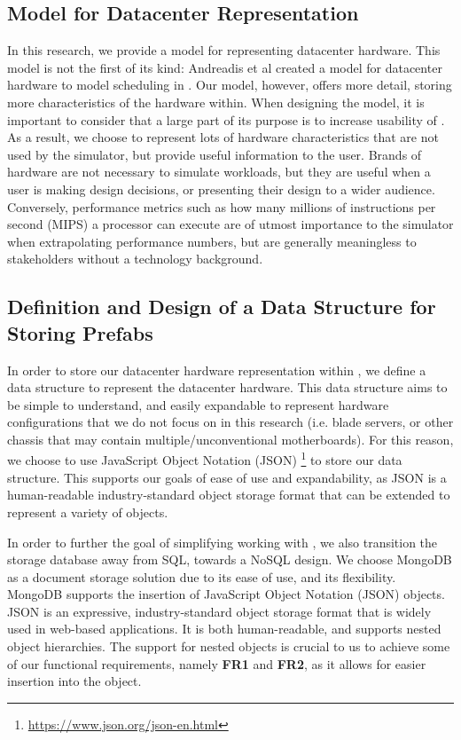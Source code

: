 \documentclass[11pt]{article}
\begin{document}

	\subsection{Model for Datacenter Representation}
		In this research, we provide a model for representing datacenter hardware. 
		This model is not the first of its kind: Andreadis et al created a model for datacenter hardware to model scheduling in \opendc{} \cite{Andreadis2018}. 
		Our model, however, offers more detail, storing more characteristics of the hardware within.
		When designing the model, it is important to consider that a large part of its purpose is to increase usability of \opendc{}. 
		As a result, we choose to represent lots of hardware characteristics that are not used by the simulator, but provide useful information to the user. 
		Brands of hardware are not necessary to simulate workloads, but they are useful when a user is making design decisions, or presenting their design to a wider audience.
		Conversely, performance metrics such as how many millions of instructions per second (MIPS) a processor can execute are of utmost importance to the simulator when extrapolating performance numbers, but are generally meaningless to stakeholders without a technology background.
	
	\subsection{Definition and Design of a Data Structure for Storing Prefabs}
		In order to store our datacenter hardware representation within \opendc{}, we define a data structure to represent the datacenter hardware. 
		This data structure aims to be simple to understand, and easily expandable to represent hardware configurations that we do not focus on in this research (i.e. blade servers, or other chassis that may contain multiple/unconventional motherboards). 
		For this reason, we choose to use JavaScript Object Notation (JSON) \footnote{\url{https://www.json.org/json-en.html}} to store our data structure. 
		This supports our goals of ease of use and expandability, as JSON is a human-readable industry-standard object storage format that can be extended to represent a variety of objects.

		In order to further the goal of simplifying working with \opendc{}, we also transition the storage database away from SQL, towards a NoSQL design.
		We choose MongoDB as a document storage solution due to its ease of use, and its flexibility.
		MongoDB supports the insertion of JavaScript Object Notation (JSON) objects.
		JSON is an expressive, industry-standard object storage format that is widely used in web-based applications.
		It is both human-readable, and supports nested object hierarchies.
		The support for nested objects is crucial to us to achieve some of our functional requirements, namely \textbf{FR1} and \textbf{FR2}, as it allows for easier insertion into the object.
\end{document}
